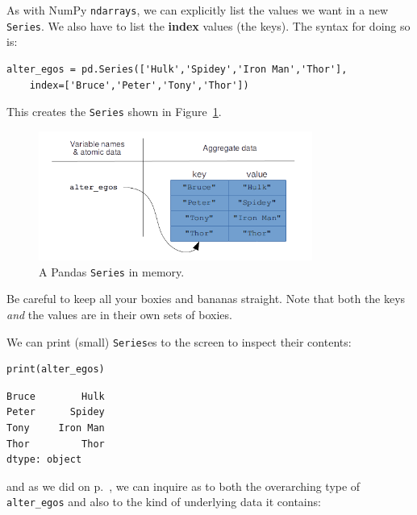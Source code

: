 As with NumPy \texttt{ndarrays}, we can explicitly list the values we want in a
new \texttt{Series}. We also have to list the \textbf{index} values (the keys).
The syntax for doing so is:

\label{marvelSeries}

\begin{Verbatim}[fontsize=\small,samepage=true,frame=single,framesep=3mm]
alter_egos = pd.Series(['Hulk','Spidey','Iron Man','Thor'],
    index=['Bruce','Peter','Tony','Thor'])
\end{Verbatim}

This creates the \texttt{Series} shown in Figure~\ref{fig:Series}.

\begin{figure}[ht]
\centering
\includegraphics[width=0.8\textwidth]{Series.png}
\caption{A Pandas \texttt{Series} in memory.}
\label{fig:Series}
\end{figure}


Be careful to keep all your boxies and bananas straight. Note that both the
keys \textit{and} the values are in their own sets of boxies.

We can print (small) \texttt{Series}es to the screen to inspect their contents:

\begin{Verbatim}[fontsize=\small,samepage=true,frame=single,framesep=3mm]
print(alter_egos)
\end{Verbatim}

\begin{Verbatim}[fontsize=\small,samepage=true,frame=leftline,framesep=5mm,framerule=1mm]
Bruce        Hulk
Peter      Spidey
Tony     Iron Man
Thor         Thor
dtype: object
\end{Verbatim}

and as we did on p.~\pageref{arrayType}, we can inquire as to both the
overarching type of \texttt{alter\_egos} and also to the kind of underlying
data it contains:

